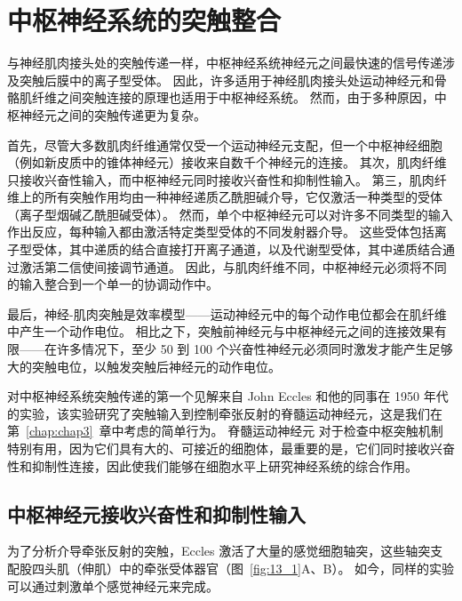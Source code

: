 \chapter{中枢神经系统的突触整合} \label{chap:chap13}

与神经肌肉接头处的突触传递一样，中枢神经系统神经元之间最快速的信号传递涉及突触后膜中的离子型受体。
因此，许多适用于神经肌肉接头处运动神经元和骨骼肌纤维之间突触连接的原理也适用于中枢神经系统。
然而，由于多种原因，中枢神经元之间的突触传递更为复杂。


首先，尽管大多数肌肉纤维通常仅受一个运动神经元支配，但一个中枢神经细胞（例如新皮质中的锥体神经元）接收来自数千个神经元的连接。
其次，肌肉纤维只接收兴奋性输入，而中枢神经元同时接收兴奋性和抑制性输入。
第三，肌肉纤维上的所有突触作用均由一种神经递质乙酰胆碱介导，它仅激活一种类型的受体（离子型烟碱乙酰胆碱受体）。
然而，单个中枢神经元可以对许多不同类型的输入作出反应，每种输入都由激活特定类型受体的不同发射器介导。 
这些受体包括离子型受体，其中递质的结合直接打开离子通道，以及代谢型受体，其中递质结合通过激活第二信使间接调节通道。
因此，与肌肉纤维不同，中枢神经元必须将不同的输入整合到一个单一的协调动作中。


最后，神经-肌肉突触是效率模型——运动神经元中的每个动作电位都会在肌纤维中产生一个动作电位。
相比之下，突触前神经元与中枢神经元之间的连接效果有限——在许多情况下，至少 50 到 100 个兴奋性神经元必须同时激发才能产生足够大的突触电位，以触发突触后神经元的动作电位。


对中枢神经系统突触传递的第一个见解来自 John Eccles 和他的同事在 1950 年代的实验，该实验研究了突触输入到控制牵张反射的脊髓运动神经元，这是我们在第~\ref{chap:chap3}~章中考虑的简单行为。
脊髓运动神经元 对于检查中枢突触机制特别有用，因为它们具有大的、可接近的细胞体，最重要的是，它们同时接收兴奋性和抑制性连接，因此使我们能够在细胞水平上研究神经系统的综合作用。



\section{中枢神经元接收兴奋性和抑制性输入}

为了分析介导牵张反射的突触，Eccles 激活了大量的感觉细胞轴突，这些轴突支配股四头肌（伸肌）中的牵张受体器官（图~\ref{fig:13_1}A、B）。 
如今，同样的实验可以通过刺激单个感觉神经元来完成。


